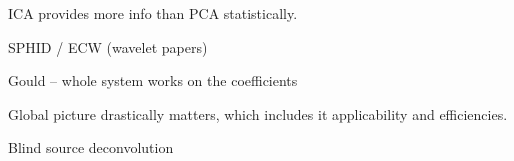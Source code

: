 ICA provides more info than PCA statistically.  

SPHID / ECW (wavelet papers)

Gould -- whole system works on the coefficients 

Global picture drastically matters, which includes it applicability and efficiencies.  


Blind source deconvolution